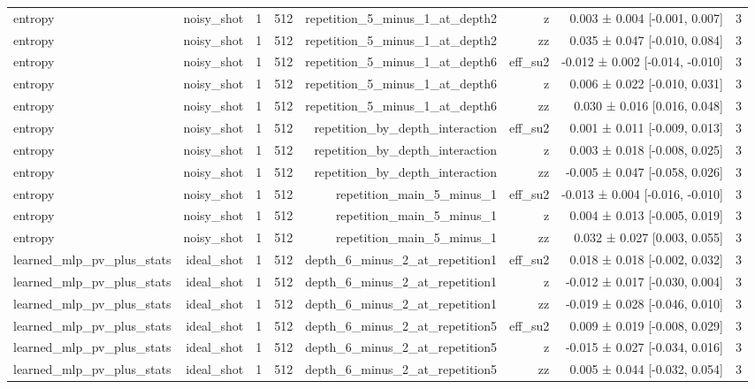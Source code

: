 \begin{table}
\begin{tabular}{lrrrrrrr}
entropy & noisy\_shot & 1 & 512 & repetition\_5\_minus\_1\_at\_depth2 & z & 0.003 ± 0.004 [-0.001, 0.007] & 3 \\
entropy & noisy\_shot & 1 & 512 & repetition\_5\_minus\_1\_at\_depth2 & zz & 0.035 ± 0.047 [-0.010, 0.084] & 3 \\
entropy & noisy\_shot & 1 & 512 & repetition\_5\_minus\_1\_at\_depth6 & eff\_su2 & -0.012 ± 0.002 [-0.014, -0.010] & 3 \\
entropy & noisy\_shot & 1 & 512 & repetition\_5\_minus\_1\_at\_depth6 & z & 0.006 ± 0.022 [-0.010, 0.031] & 3 \\
entropy & noisy\_shot & 1 & 512 & repetition\_5\_minus\_1\_at\_depth6 & zz & 0.030 ± 0.016 [0.016, 0.048] & 3 \\
entropy & noisy\_shot & 1 & 512 & repetition\_by\_depth\_interaction & eff\_su2 & 0.001 ± 0.011 [-0.009, 0.013] & 3 \\
entropy & noisy\_shot & 1 & 512 & repetition\_by\_depth\_interaction & z & 0.003 ± 0.018 [-0.008, 0.025] & 3 \\
entropy & noisy\_shot & 1 & 512 & repetition\_by\_depth\_interaction & zz & -0.005 ± 0.047 [-0.058, 0.026] & 3 \\
entropy & noisy\_shot & 1 & 512 & repetition\_main\_5\_minus\_1 & eff\_su2 & -0.013 ± 0.004 [-0.016, -0.010] & 3 \\
entropy & noisy\_shot & 1 & 512 & repetition\_main\_5\_minus\_1 & z & 0.004 ± 0.013 [-0.005, 0.019] & 3 \\
entropy & noisy\_shot & 1 & 512 & repetition\_main\_5\_minus\_1 & zz & 0.032 ± 0.027 [0.003, 0.055] & 3 \\
learned\_mlp\_pv\_plus\_stats & ideal\_shot & 1 & 512 & depth\_6\_minus\_2\_at\_repetition1 & eff\_su2 & 0.018 ± 0.018 [-0.002, 0.032] & 3 \\
learned\_mlp\_pv\_plus\_stats & ideal\_shot & 1 & 512 & depth\_6\_minus\_2\_at\_repetition1 & z & -0.012 ± 0.017 [-0.030, 0.004] & 3 \\
learned\_mlp\_pv\_plus\_stats & ideal\_shot & 1 & 512 & depth\_6\_minus\_2\_at\_repetition1 & zz & -0.019 ± 0.028 [-0.046, 0.010] & 3 \\
learned\_mlp\_pv\_plus\_stats & ideal\_shot & 1 & 512 & depth\_6\_minus\_2\_at\_repetition5 & eff\_su2 & 0.009 ± 0.019 [-0.008, 0.029] & 3 \\
learned\_mlp\_pv\_plus\_stats & ideal\_shot & 1 & 512 & depth\_6\_minus\_2\_at\_repetition5 & z & -0.015 ± 0.027 [-0.034, 0.016] & 3 \\
learned\_mlp\_pv\_plus\_stats & ideal\_shot & 1 & 512 & depth\_6\_minus\_2\_at\_repetition5 & zz & 0.005 ± 0.044 [-0.032, 0.054] & 3 \\

\end{tabular}
\end{table}
